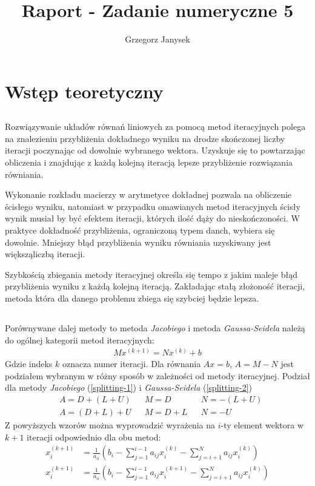 \documentclass[11pt]{extarticle}
\author{Grzegorz Janysek}
\title{Raport - Zadanie numeryczne 5}
\begin{document}
	\maketitle

	\section{Wstęp teoretyczny}

	\subsection{}
	Rozwiązywanie układów równań liniowych za pomocą metod iteracyjnych polega na znalezieniu przybliżenia dokładnego wyniku na drodze skończonej liczby iteracji poczynając od dowolnie wybranego wektora.
	Uzyskuje się to powtarzając obliczenia i znajdując z każdą kolejną iteracją lepsze przybliżenie rozwiązania równiania.
	
	Wykonanie rozkładu macierzy w arytmetyce dokładnej pozwala na obliczenie ścisłego wyniku,
	natomiast w przypadku omawianych metod iteracyjnych ścisły wynik musiał by być efektem iteracji, których ilość dąży do nieskończoności.
	W praktyce dokładność przybliżenia, ograniczoną typem danch, wybiera się dowolnie.
	Mniejszy błąd przybliżenia wyniku równiania uzyskiwany jest większąliczbą iteracji.

	Szybkością zbiegania metody iteracyjnej określa się tempo z jakim maleje błąd przybliżenia wyniku z każdą kolejną iteracją.
	Zakładając stałą złożoność iteracji, metoda która dla danego problemu zbiega się szybciej będzie lepsza.
	\subsection{}
	Porównywane dalej metody to metoda \textit{Jacobiego} i metoda \textit{Gaussa-Seidela} należą do ogólnej kategorii metod iteracyjnych:
	\begin{align}
		Mx^{(k+1)} = Nx^{(k)} + b
	\end{align}
	Gdzie indeks \(k\) oznacza numer iteracji.
	Dla równania \(Ax = b\), \(A = M - N\) jest podziałem wybranym w różny sposób w zależności od metody iteracyjnej.
	Podział dla metody \textit{Jacobiego} (\ref{splitting-1}) i \textit{Gaussa-Seidela} (\ref{splitting-2})
	\begin{align}
		\label{splitting-1}
		&A = D + (L + U)	&&M=D		&&N = - (L + U) \\
		\label{splitting-2}
		&A = (D + L) + U	&&M=D + L	&&N = - U
	\end{align}
	Z powyższych wzorów można wyprowadzić wyrażenia na \(i\)-ty element wektora w \(k+1\) iteracji odpowiednio dla obu metod:
	\begin{align}
		x_i^{(k+1)} &= \frac{1}{a_{ii}} \left( b_i - \sum_{j=1}^{i-1} a_{ij} x_{i}^{(k)} - \sum_{j=i+1}^{N} a_{ij} x_{i}^{(k)} \right) \\
		x_i^{(k+1)} &= \frac{1}{a_{ii}} \left( b_i - \sum_{j=1}^{i-1} a_{ij} x_{i}^{(k+1)} - \sum_{j=i+1}^{N} a_{ij} x_{i}^{(k)} \right)
	\end{align}
\end{document}
